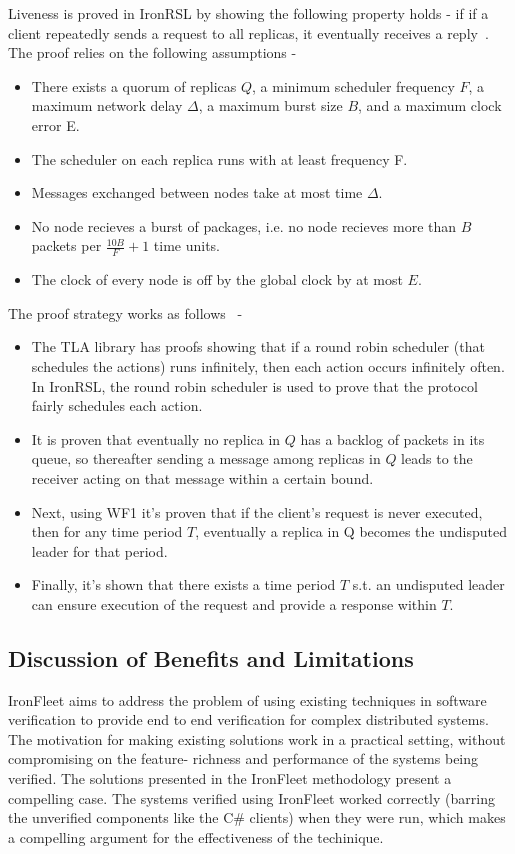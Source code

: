 \documentclass{llncs}
\begin{document}
Liveness is proved in IronRSL by showing the following property holds - if if a client repeatedly
sends a request to all replicas, it eventually receives
a reply~\cite{ironfleet}. The proof relies on the following assumptions - 
\begin{itemize} 
    \item There exists a quorum of replicas $Q$, a
        minimum scheduler frequency $F$, a maximum network delay
        $\Delta$, a maximum burst size $B$, and a maximum clock error E.
    \item The scheduler on each replica runs with at least frequency F.
    \item Messages exchanged between nodes take at most time $\Delta$.
    \item No node recieves a burst of packages, i.e. no node recieves more
          than $B$ packets per $\frac{10B}{F} + 1$ time units.
    \item The clock of every node is off by the global clock by at most $E$.
\end{itemize}

The proof strategy works as follows~\cite{ironfleet} - 
\begin{itemize}
    \item The TLA library has proofs showing that if a round robin scheduler (that 
        schedules the actions) runs infinitely, then each action occurs
        infinitely often. In IronRSL, the round robin scheduler is used to prove that
        the protocol fairly schedules each action.
    \item It is proven that eventually no replica in $Q$ 
        has a backlog of packets in its queue, so
        thereafter sending a message among replicas in $Q$ leads to
        the receiver acting on that message within a certain bound.
    \item Next, using WF1 it's proven that if the client’s request
        is never executed, then for any time period $T$, eventually a
        replica in Q becomes the undisputed leader for that period.
    \item Finally, it's shown that there exists a time period $T$ s.t. 
        an undisputed leader can ensure execution of the request and 
        provide a response within $T$.
\end{itemize}

\subsection{Discussion of Benefits and Limitations}
IronFleet aims to address the problem of using existing techniques in software verification
to provide end to end verification for complex distributed systems. The motivation for 
making existing solutions work in a practical setting, without compromising on the feature-
richness and performance of the systems being verified. The solutions presented in the IronFleet
methodology present a compelling case. The systems verified using IronFleet worked correctly (barring
the unverified components like the C\# clients)
when they were run, which makes a compelling argument for the effectiveness of the techinique.
\end{document}
